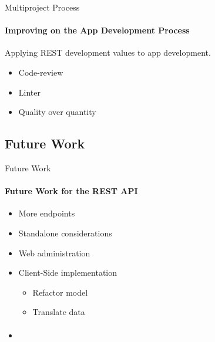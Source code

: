     \begin{frame}[t]{Multiproject Process}\framesubtitle{Improving on the App Development Process}
            \item Applying REST development values to app development.
            \begin{itemize}
                \item Code-review
                \item Linter
                \item Quality over quantity
            \end{itemize}
    \end{frame}

    \subsection{Future Work}
    \begin{frame}[t]{Future Work}\framesubtitle{Future Work for the REST API}
        \begin{itemize}            
            \item More endpoints
            \item Standalone considerations
            \item Web administration
            \item Client-Side implementation
            \begin{itemize}
                \item Refactor model
                \item Translate data
            \end{itemize}
        \end{itemize}
    \end{frame}

    \begin{frame}[t]{}\framesubtitle{}
        \begin{itemize} 
            \item
        \end{itemize}
    \end{frame}